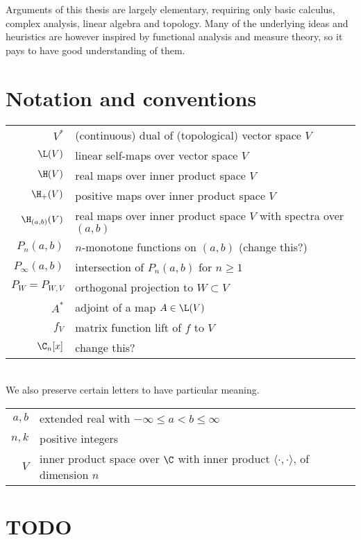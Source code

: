 Arguments of this thesis are largely elementary, requiring only basic calculus, complex analysis, linear algebra and topology. Many of the underlying ideas and heuristics are however inspired by functional analysis and measure theory, so it pays to have good understanding of them.

\section{Notation and conventions}

\begin{tabular}{r l}
	$V^{*}$ & (continuous) dual of (topological) vector space $V$ \\
	$\L(V)$ & linear self-maps over vector space $V$ \\
	$\H(V)$ & real maps over inner product space $V$ \\
	$\H_{+}(V)$ & positive maps over inner product space $V$ \\
	$\H_{(a, b)}(V)$ & real maps over inner product space $V$ with spectra over $(a, b)$ \\
	$P_{n}(a, b)$ & $n$-monotone functions on $(a, b)$ (change this?) \\
	$P_{\infty}(a, b)$ & intersection of $P_{n}(a, b)$ for $n \geq 1$ \\
	$P_{W} = P_{W, V}$ & orthogonal projection to $W \subset V$ \\
	$A^{*}$ & adjoint of a map $A \in \L(V)$ \\
	$f_{V}$ & matrix function lift of $f$ to $V$ \\
	$\C_{n}[x]$ & change this? \\
\end{tabular}
\\
We also preserve certain letters to have particular meaning.
\\
\begin{tabular}{r l}
	$a, b$ & extended real with $-\infty \leq a < b \leq \infty$ \\ 
	$n, k$ & positive integers \\
	$V$ & inner product space over $\C$ with inner product $\langle \cdot, \cdot \rangle$, of dimension $n$ \\
\end{tabular}


\section{TODO}

